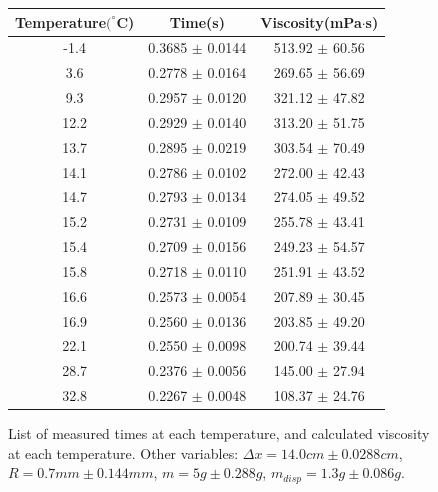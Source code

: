 \documentclass[aps,twocolumn,showpacs,preprintnumbers]{revtex4}
\begin{document}
\begin{figure}
\begin{center}
\begin{tabular}{ |c|c|c| } 
 \hline
Temperature$(^{\circ}$C) & Time(s) & Viscosity(mPa$\cdot$s) \\ 
 \hline
 -1.4  & 0.3685 $\pm$ 0.0144 & 513.92 $\pm$ 60.56 \\ 
 3.6 & 0.2778 $\pm$ 0.0164 & 269.65 $\pm$ 56.69 \\ 
9.3 & 0.2957 $\pm$ 0.0120 & 321.12 $\pm$ 47.82 \\ 
 12.2 & 0.2929 $\pm$ 0.0140 & 313.20 $\pm$ 51.75 \\ 
 13.7 & 0.2895 $\pm$ 0.0219 & 303.54 $\pm$ 70.49 \\ 
 14.1 & 0.2786 $\pm$ 0.0102 & 272.00 $\pm$ 42.43 \\ 
 14.7 & 0.2793 $\pm$ 0.0134 & 274.05 $\pm$ 49.52 \\ 
 15.2 & 0.2731 $\pm$ 0.0109 & 255.78 $\pm$ 43.41 \\ 
  15.4 & 0.2709 $\pm$ 0.0156 & 249.23 $\pm$ 54.57 \\ 
 15.8 & 0.2718 $\pm$ 0.0110 & 251.91 $\pm$ 43.52 \\ 
 16.6 & 0.2573 $\pm$ 0.0054 & 207.89 $\pm$ 30.45 \\ 
  16.9 & 0.2560 $\pm$ 0.0136 & 203.85 $\pm$ 49.20 \\ 
 22.1 & 0.2550 $\pm$ 0.0098 & 200.74 $\pm$ 39.44 \\ 
 28.7 & 0.2376 $\pm$ 0.0056 & 145.00 $\pm$ 27.94 \\ 
 32.8 & 0.2267 $\pm$ 0.0048 & 108.37 $\pm$ 24.76 \\ 




 \hline
\end{tabular}

\caption{\label{rawData3} List of measured times at each temperature, and calculated viscosity at each temperature. Other variables: $\Delta x = 14.0 cm \pm 0.0288 cm$, $R = 0.7 mm \pm 0.144mm$, $m = 5g \pm 0.288g$, $m_{disp}=1.3g \pm 0.086g$. 
}

\end{center}

\end{figure}
\end{document}

